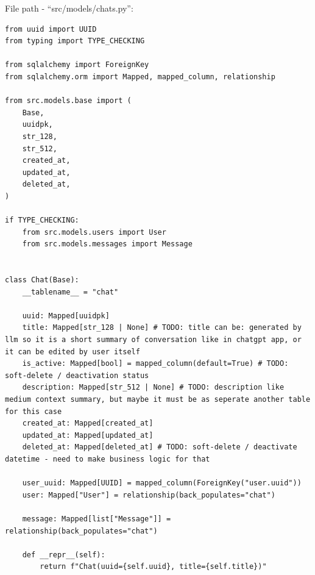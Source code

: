 File path - ``src/models/chats.py'':
\begin{lstlisting}
from uuid import UUID
from typing import TYPE_CHECKING

from sqlalchemy import ForeignKey
from sqlalchemy.orm import Mapped, mapped_column, relationship

from src.models.base import (
    Base,
    uuidpk,
    str_128,
    str_512,
    created_at,
    updated_at,
    deleted_at,
)

if TYPE_CHECKING:
    from src.models.users import User
    from src.models.messages import Message


class Chat(Base):
    __tablename__ = "chat"

    uuid: Mapped[uuidpk]
    title: Mapped[str_128 | None] # TODO: title can be: generated by llm so it is a short summary of conversation like in chatgpt app, or it can be edited by user itself
    is_active: Mapped[bool] = mapped_column(default=True) # TODO: soft-delete / deactivation status
    description: Mapped[str_512 | None] # TODO: description like medium context summary, but maybe it must be as seperate another table for this case
    created_at: Mapped[created_at]
    updated_at: Mapped[updated_at]
    deleted_at: Mapped[deleted_at] # TODO: soft-delete / deactivate datetime - need to make business logic for that

    user_uuid: Mapped[UUID] = mapped_column(ForeignKey("user.uuid"))
    user: Mapped["User"] = relationship(back_populates="chat")
    
    message: Mapped[list["Message"]] = relationship(back_populates="chat")

    def __repr__(self):
        return f"Chat(uuid={self.uuid}, title={self.title})"
\end{lstlisting}

\clearpage

